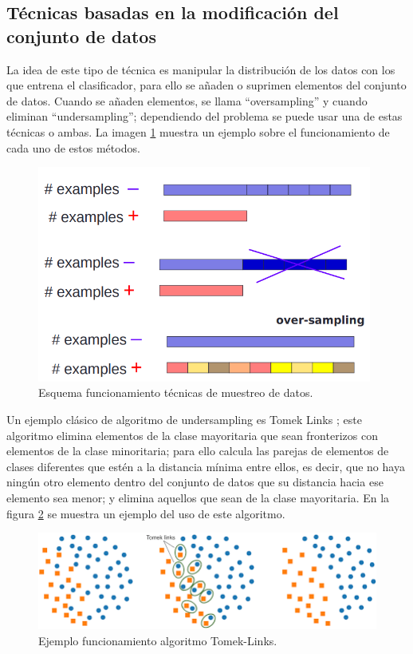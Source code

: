 \subsection{Técnicas basadas en la modificación del conjunto de datos}
La idea de este tipo de técnica es manipular la distribución de los datos con los que entrena el clasificador, para ello se añaden o suprimen elementos del conjunto de datos. Cuando se añaden elementos, se llama “oversampling” y cuando eliminan “undersampling”; dependiendo del problema se puede usar una de estas técnicas o ambas. La imagen \ref{fig:27} muestra un ejemplo sobre el funcionamiento de cada uno de estos métodos.\newline
\newpage
\begin{figure}[h]
	\centering
	\includegraphics[width=110mm]{imagenes/oversampling_undersampling.png}
	\caption{Esquema funcionamiento técnicas de muestreo de datos.}
	\label{fig:27}
\end{figure}
\verticalspace

Un ejemplo clásico de algoritmo de undersampling es Tomek Links \cite{tomek1976two}; este algoritmo elimina elementos de la clase mayoritaria que sean fronterizos con elementos de la clase minoritaria; para ello calcula las parejas de elementos de clases diferentes que estén a la distancia mínima entre ellos, es decir, que no haya ningún otro elemento dentro del conjunto de datos que su distancia hacia ese elemento sea menor; y elimina aquellos que sean de la clase mayoritaria. En la figura \ref{fig:28} se muestra un ejemplo del uso de este algoritmo.\newline


\begin{figure}[h]
	\centering
	\includegraphics[width=120mm]{imagenes/tomek-example.png}
	\caption{Ejemplo funcionamiento algoritmo Tomek-Links.}
	\label{fig:28}
\end{figure}
\verticalspace

